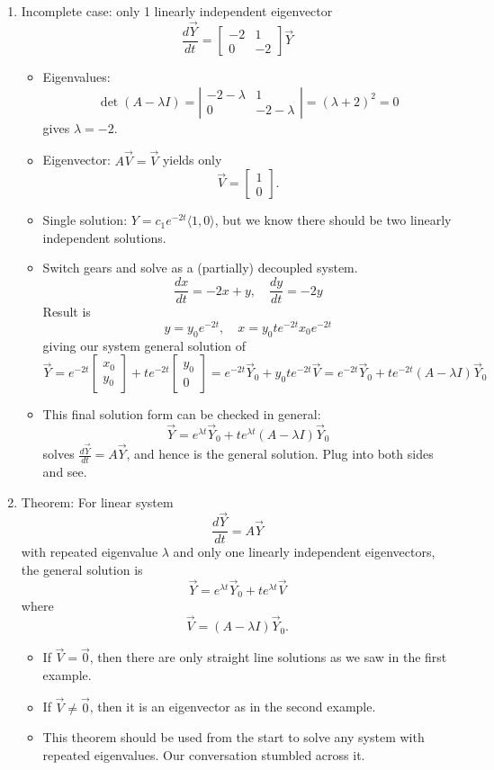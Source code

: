 \documentclass{article}
\begin{document}
\begin{enumerate}
\begin{enumerate}
\item Incomplete case: only 1 linearly independent eigenvector
\[
\frac{d\vec{Y}}{dt} = 
\begin{bmatrix}
-2 & 1 \\
0 & -2
\end{bmatrix} \vec{Y}
\]
\begin{itemize}
\item Eigenvalues:
\[
\det(A-\lambda I) = \left|
\begin{array}{cc}
-2-\lambda & 1 \\
0 & -2-\lambda
\end{array} \right|
= (\lambda+2)^2 = 0
\]
gives $\lambda = -2$.
\item Eigenvector: $A\vec{V}=\vec{V}$ yields only
\[
\vec{V} = \begin{bmatrix}
1 \\ 0
\end{bmatrix}.
\]
\item Single solution: $Y = c_1 e^{-2t} \langle 1,0 \rangle$, but we know there should be two linearly independent solutions.
\item Switch gears and solve as a (partially) decoupled system.
\[
\frac{dx}{dt} = -2x+y, \quad \frac{dy}{dt} = -2y
\]
Result is 
\[
y = y_0 e^{-2t}, \quad x = y_0te^{-2t}x_0e^{-2t}
\]
giving our system general solution of
\[
\vec{Y} = e^{-2t} \begin{bmatrix}
x_0 \\ y_0 
\end{bmatrix}
+ te^{-2t} \begin{bmatrix}
y_0 \\ 0
\end{bmatrix}
= e^{-2t} \vec{Y}_0
+ y_0 te^{-2t} \vec{V}
=e^{-2t} \vec{Y}_0
+ te^{-2t} (A-\lambda I) \vec{Y}_0
\]
\item This final solution form can be checked in general:
\[
\vec{Y} =e^{\lambda t} \vec{Y}_0
+ te^{\lambda t} (A-\lambda I) \vec{Y}_0
\]
solves $\frac{d\vec{Y}}{dt} = A \vec{Y}$, and hence is the general solution. Plug into both sides and see.
\end{itemize}

\item Theorem: For linear system
\[
\frac{d\vec{Y}}{dt} = A \vec{Y}
\]
with repeated eigenvalue $\lambda$ and only one linearly independent eigenvectors, the general solution is
\[
\vec{Y} = e^{\lambda t} \vec{Y}_0 + t e^{\lambda t} \vec{V}
\]
where
\[
\vec{V} = (A-\lambda I) \vec{Y}_0.
\]
\begin{itemize}
\item If $\vec{V}=\vec{0}$, then there are only straight line solutions as we saw in the first example.
\item If $\vec{V} \neq \vec{0}$, then it is an eigenvector as in the second example.
\item This theorem should be used from the start to solve any system with repeated eigenvalues. Our conversation stumbled across it. 
\end{itemize}


\end{enumerate}
\end{enumerate}
\end{document}
